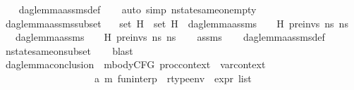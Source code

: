 \begin{isabellebody}
%
\isadelimproof
\ \ %
\endisadelimproof
%
\isatagproof
{}\isamarkupfalse%
\ dag{\isacharunderscore}{\kern0pt}lemma{\isacharunderscore}{\kern0pt}assms{\isacharunderscore}{\kern0pt}def\isanewline
\ \ \isamarkupfalse%
\ {\isacharparenleft}{\kern0pt}auto\ simp{\isacharcolon}{\kern0pt}\ nstate{\isacharunderscore}{\kern0pt}same{\isacharunderscore}{\kern0pt}on{\isacharunderscore}{\kern0pt}empty{\isacharparenright}{\kern0pt}%
\endisatagproof
{\isafoldproof}%
%
\isadelimproof
\isanewline
%
\endisadelimproof
\isanewline
{}\isamarkupfalse%
\ dag{\isacharunderscore}{\kern0pt}lemma{\isacharunderscore}{\kern0pt}assms{\isacharunderscore}{\kern0pt}subset{\isacharcolon}{\kern0pt}\isanewline
\ \ \ {\isachardoublequoteopen}set\ H\ {\isasymsubseteq}\ set\ H{\isacharprime}{\kern0pt}{\isachardoublequoteclose}\ \ {\isachardoublequoteopen}dag{\isacharunderscore}{\kern0pt}lemma{\isacharunderscore}{\kern0pt}assms\ {\isasymLambda}\ {\isasymGamma}\ {\isasymOmega}\ H\ pre{\isacharunderscore}{\kern0pt}invs\ ns{}\ ns{}{\isachardoublequoteclose}\isanewline
\ \ \ {\isachardoublequoteopen}dag{\isacharunderscore}{\kern0pt}lemma{\isacharunderscore}{\kern0pt}assms\ {\isasymLambda}\ {\isasymGamma}\ {\isasymOmega}\ H{\isacharprime}{\kern0pt}\ pre{\isacharunderscore}{\kern0pt}invs\ ns{}\ ns{}{\isachardoublequoteclose}\isanewline
%
\isadelimproof
\ \ %
\endisadelimproof
%
\isatagproof
{}\isamarkupfalse%
\ assms\isanewline
\ \ \isamarkupfalse%
\ dag{\isacharunderscore}{\kern0pt}lemma{\isacharunderscore}{\kern0pt}assms{\isacharunderscore}{\kern0pt}def\isanewline
\ \ \isamarkupfalse%
\ nstate{\isacharunderscore}{\kern0pt}same{\isacharunderscore}{\kern0pt}on{\isacharunderscore}{\kern0pt}subset\isanewline
\ \ \isamarkupfalse%
\ blast%
\endisatagproof
{\isafoldproof}%
%
\isadelimproof
\isanewline
%
\endisadelimproof
\isanewline
{}\isamarkupfalse%
\ dag{\isacharunderscore}{\kern0pt}lemma{\isacharunderscore}{\kern0pt}conclusion\ {\isacharcolon}{\kern0pt}{\isacharcolon}{\kern0pt}\ {\isachardoublequoteopen}mbodyCFG\ proc{\isacharunderscore}{\kern0pt}context\ {\isasymRightarrow}\ var{\isacharunderscore}{\kern0pt}context\ {\isasymRightarrow}\ \isanewline
\ \ \ \ \ \ \ \ \ \ \ \ \ \ \ \ \ \ \ {\isacharparenleft}{\kern0pt}{\isacharprime}{\kern0pt}a{\isacharcomma}{\kern0pt}\ {\isacharprime}{\kern0pt}m{\isacharparenright}{\kern0pt}\ fun{\isacharunderscore}{\kern0pt}interp\ {\isasymRightarrow}\ rtype{\isacharunderscore}{\kern0pt}env\ {\isasymRightarrow}\ expr\ list\ {\isasymRightarrow}\isanewline

\end{isabellebody}
